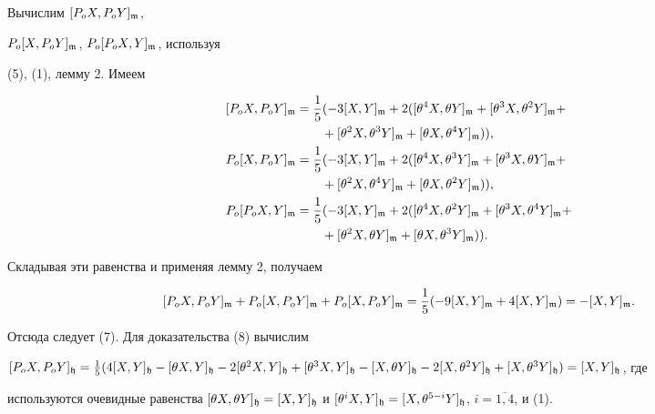\begin{pf}


Вычислим $[P_oX,P_oY]_{\frak{m}}$,


$P_o[X,P_oY]_{\frak{m}}$, $P_o[P_oX,Y]_{\frak{m}}$, используя


(5), (1), лемму 2. Имеем


\begin{align*}


[P_oX,P_oY]_{\frak{m}}&=\frac{1}{5}(-3[X,Y]_{\frak{m}}+2([\theta^4X,\theta


Y]_{\frak{m}} + [\theta^3X,\theta^2 Y]_{\frak{m}}+\\


%


&\qquad +[\theta^2X,\theta^3 Y]_{\frak{m}}+[\theta X,\theta^4


Y]_{\frak{m}})), \\


%


P_o[X,P_oY]_{\frak{m}}&=\frac{1}{5}(-3[X,Y]_{\frak{m}}+2([\theta^4X,\theta^3


Y]_{\frak{m}} + [\theta^3X,\theta Y]_{\frak{m}}+ \\


%


&\qquad +[\theta^2X,\theta^4 Y]_{\frak{m}}+[\theta X,\theta^2


Y]_{\frak{m}})), \\


%


P_o[P_oX,Y]_{\frak{m}}&=\frac{1}{5}(-3[X,Y]_{\frak{m}}+2([\theta^4X,\theta^2


Y]_{\frak{m}} + [\theta^3X,\theta^4 Y]_{\frak{m}}+ \\


%


&\qquad +[\theta^2X,\theta Y]_{\frak{m}}+[\theta X,\theta^3


Y]_{\frak{m}})).


\end{align*}


Складывая эти равенства и применяя лемму 2, получаем


$$


[P_oX,P_oY]_{\frak{m}}+P_o[X,P_oY]_{\frak{m}}+P_o[X,P_oY]_{\frak{m}}=


\frac{1}{5}(-9[X,Y]_{\frak{m}}+4[X,Y]_{\frak{m}})=-[X,Y]_{\frak{m}}.


$$


Отсюда следует (7). Для доказательства (8) вычислим


$[P_oX,P_oY]_{\frak{h}}=\frac{1}{5}(4[X,Y]_{\frak{h}}-[\theta X,


Y]_{\frak{h}} -2 [\theta^2X, Y]_{\frak{h}}+[\theta^3X,


Y]_{\frak{h}}-[ X,\theta Y]_{\frak{h}} -2[ X,\theta^2


Y]_{\frak{h}}+[ X,\theta^3 Y]_{\frak{h}})=[ X, Y]_{\frak{h}}$, где


используются очевидные равенства $[\theta X,\theta Y]_{\frak{h}}=[


X, Y]_{\frak{h}}$ и $[\theta^i X, Y]_{\frak{h}}=[ X,\theta^{5-i}


Y]_{\frak{h}}$, $i=\overline{1,4}$, и (1).


\end{pf}
